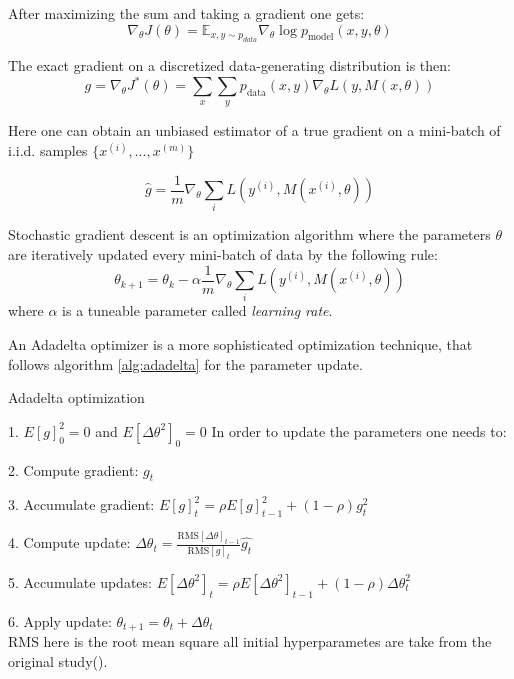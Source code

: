 After maximizing the sum and taking a gradient one gets:
\begin{equation}
	\nabla_{\theta} J(\theta) = \mathbb{E}_{x, y \sim p_{data}} \nabla_{\theta} \log{p_{\text{model}}(x, y, \theta)}
\end{equation}

The exact gradient on a discretized data-generating distribution is then:
\begin{equation}
	g = \nabla_{\theta} J^*(\theta) = \sum_{x} \sum_{y}{p_{\text{data}}(x, y) \nabla_{\theta} L(y, M(x, \theta))}
\end{equation}

Here one can obtain an unbiased estimator of a true gradient on a mini-batch of i.i.d. samples $\{x^{(i)}, ..., x^{(m)}\}$	

\begin{equation}
	\hat{g} = \frac{1}{m} \nabla_\theta \sum_{i} L(y^{(i)}, M(x^{(i)}, \theta))
\end{equation}

\begin{definition}
	Stochastic gradient descent is an optimization algorithm where the parameters $\theta$ are iteratively updated every mini-batch of data by the following rule:
	\begin{equation}
		\theta_{k+1} = \theta_k - \alpha \frac{1}{m} \nabla_\theta \sum_{i} L(y^{(i)}, M(x^{(i)}, \theta))
	\end{equation}
	where $\alpha$ is a tuneable parameter called \textit {learning rate}.
\end{definition}

\begin{definition}
	An Adadelta optimizer is a more sophisticated optimization technique, that follows algorithm \ref{alg:adadelta} for the parameter update.
	\begin{algorithm}[H]
		\caption{Adadelta optimization}\label{alg:adadelta}
		\item 1. $E[g]^2_0 = 0$ and $E[\Delta \theta^2]_0 = 0$
		In order to update the parameters one needs to:
		\item 2. Compute gradient: $g_t$
		\item 3. Accumulate gradient: $E[g]^2_t = \rho E[g]^2_{t - 1} + (1 - \rho)g_t^2$
		\item 4. Compute update: $\Delta \theta_t = \frac{\text{RMS}[\Delta \theta]_{t-1}}{\text{RMS}[g]_t} \hat{g_t}$
		\item 5. Accumulate updates: $E[\Delta \theta^2]_t = \rho E[\Delta \theta^2]_{t-1} + (1 - \rho) \Delta \theta^2_t$
		\item 6. Apply update: $\theta_{t+1} = \theta_t + \Delta \theta_t$ \\
		RMS here is the root mean square all initial hyperparametes are take from the original study(\cite{Zeiler_2012}).
	\end{algorithm}
\end{definition}

